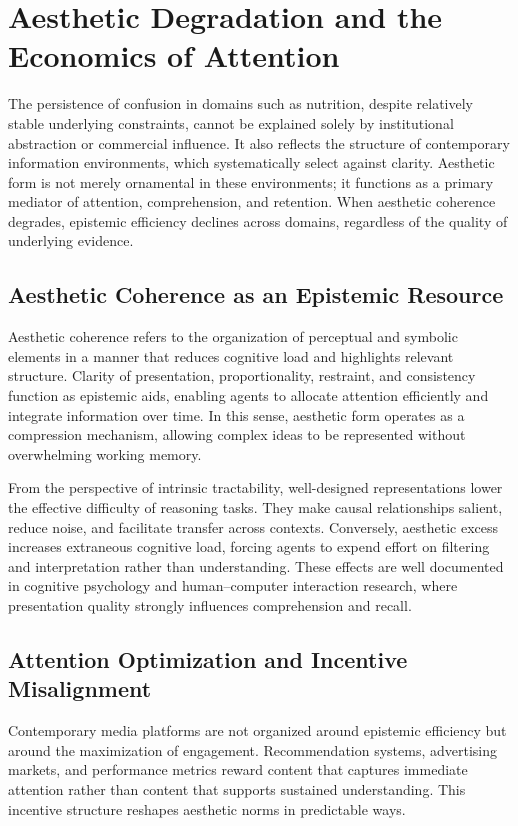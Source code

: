 \documentclass[11pt]{article}
\begin{document}
\section{Aesthetic Degradation and the Economics of Attention}

The persistence of confusion in domains such as nutrition, despite relatively stable underlying constraints, cannot be explained solely by institutional abstraction or commercial influence. It also reflects the structure of contemporary information environments, which systematically select against clarity. Aesthetic form is not merely ornamental in these environments; it functions as a primary mediator of attention, comprehension, and retention. When aesthetic coherence degrades, epistemic efficiency declines across domains, regardless of the quality of underlying evidence.

\subsection{Aesthetic Coherence as an Epistemic Resource}

Aesthetic coherence refers to the organization of perceptual and symbolic elements in a manner that reduces cognitive load and highlights relevant structure. Clarity of presentation, proportionality, restraint, and consistency function as epistemic aids, enabling agents to allocate attention efficiently and integrate information over time. In this sense, aesthetic form operates as a compression mechanism, allowing complex ideas to be represented without overwhelming working memory.

From the perspective of intrinsic tractability, well-designed representations lower the effective difficulty of reasoning tasks. They make causal relationships salient, reduce noise, and facilitate transfer across contexts. Conversely, aesthetic excess increases extraneous cognitive load, forcing agents to expend effort on filtering and interpretation rather than understanding. These effects are well documented in cognitive psychology and human–computer interaction research, where presentation quality strongly influences comprehension and recall.

\subsection{Attention Optimization and Incentive Misalignment}

Contemporary media platforms are not organized around epistemic efficiency but around the maximization of engagement. Recommendation systems, advertising markets, and performance metrics reward content that captures immediate attention rather than content that supports sustained understanding. This incentive structure reshapes aesthetic norms in predictable ways.
\end{document}
